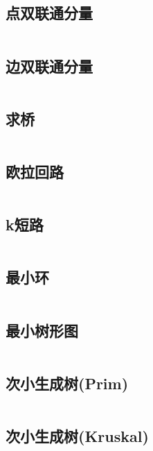 \inputminted{cpp}{code/Kosaraju.cc}

\subsection{点双联通分量} 

\inputminted{cpp}{code/BCCpoint.cc}

\subsection{边双联通分量} 

\inputminted{cpp}{code/BCCedge.cc}

\subsection{求桥} 

\inputminted{cpp}{code/bridge.cc}

\subsection{欧拉回路} 

\inputminted{cpp}{code/euler_circuit.cc}

\subsection{k短路} 

\inputminted{cpp}{code/kth_shortest_path.cc}

\subsection{最小环} 

\inputminted{cpp}{code/floyd_mincycle.cc}

\subsection{最小树形图} 

\inputminted{cpp}{code/Directed_MST.cc}

\subsection{次小生成树(Prim)} 

\inputminted{cpp}{code/SMST_Prim.cc}

\subsection{次小生成树(Kruskal)} 


